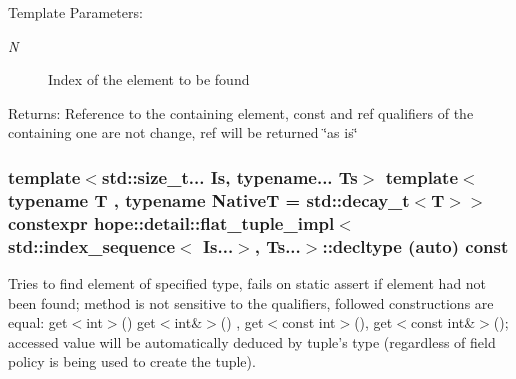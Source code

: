 \begin{Desc}
\item[Template Parameters:]
\begin{description}
\item[{\em N}]Index of the element to be found \end{description}
\end{Desc}
\begin{Desc}
\item[Returns:]Reference to the containing element, const and ref qualifiers of the containing one are not change, ref will be returned \char`\"{}as is\char`\"{} \end{Desc}
\hypertarget{classhope_1_1detail_1_1flat__tuple__impl_3_01std_1_1index__sequence_3_01_is_8_8_8_4_00_01_ts_8_8_8_4_0db8adfa32e775efc297ffd41fdda6a7}{
\subsubsection[{decltype}]{\setlength{\rightskip}{0pt plus 5cm}template$<$std::size\_\-t... Is, typename... Ts$>$ template$<$typename T , typename NativeT  = std::decay\_\-t$<$T$>$$>$ constexpr hope::detail::flat\_\-tuple\_\-impl$<$ std::index\_\-sequence$<$ Is...$>$, Ts...$>$::decltype (auto) const}}
\label{classhope_1_1detail_1_1flat__tuple__impl_3_01std_1_1index__sequence_3_01_is_8_8_8_4_00_01_ts_8_8_8_4_0db8adfa32e775efc297ffd41fdda6a7}


Tries to find element of specified type, fails on static assert if element had not been found; method is not sensitive to the qualifiers, followed constructions are equal: get$<$int$>$() get$<$int\&$>$() , get$<$const int$>$(), get$<$const int\&$>$(); accessed value will be automatically deduced by tuple's type (regardless of field policy is being used to create the tuple). 

